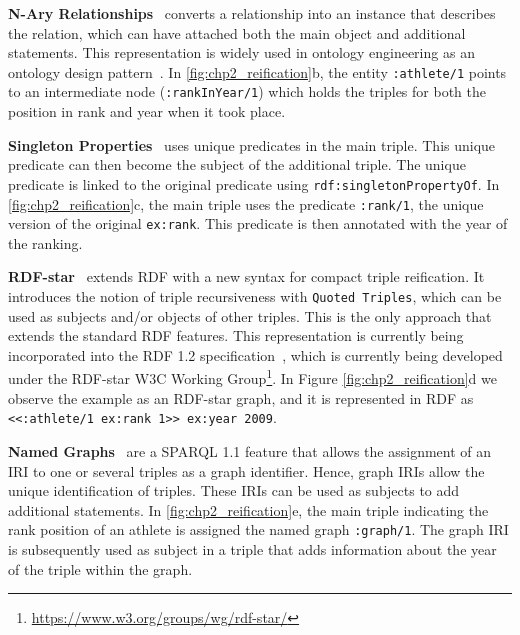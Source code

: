 \noindent\textbf{N-Ary Relationships}~\parencite{naryw3c2006} converts a relationship into an instance that describes the relation, which can have attached both the main object and additional statements.
This representation is widely used in ontology engineering as an ontology design pattern~\parencite{gangemi2013multi}. In \cref{fig:chp2_reification}b, the entity \texttt{:athlete/1} points to an intermediate node (\texttt{:rankInYear/1}) which holds the triples for both the position in rank and year when it took place.

\noindent\textbf{Singleton Properties}~\parencite{nguyen2014don} uses unique predicates in the main triple. This unique predicate can then become the subject of the additional triple. The unique predicate is linked to the original predicate using \texttt{rdf:singletonPropertyOf}.
In \cref{fig:chp2_reification}c, the main triple uses the predicate \texttt{:rank/1}, the unique version of the original \texttt{ex:rank}. This predicate is then annotated with the year of the ranking. 

\noindent\textbf{RDF-star}~\parencite{hartig2017foundations,hartig2023rdf} extends RDF with a new syntax for compact triple reification. 
It introduces the notion of triple recursiveness with \texttt{Quoted Triples}, which can be used as subjects and/or objects of other triples. This is the only approach that extends the standard RDF features. 
This representation is currently being incorporated into the RDF 1.2 specification~\parencite{hartig2023rdf}, which is currently being developed under the RDF-star W3C Working Group\footnote{\url{https://www.w3.org/groups/wg/rdf-star/}}.
In Figure \ref{fig:chp2_reification}d we observe the example as an RDF-star graph, and it is represented in RDF as \texttt{{<<:athlete/1 ex:rank 1>> ex:year 2009}}.


\noindent\textbf{Named Graphs}~\parencite{rdf} are a SPARQL 1.1 feature that allows the assignment of an IRI to one or several triples as a graph identifier. Hence, graph IRIs allow the unique identification of triples. These IRIs can be used as subjects to add additional statements. 
In \cref{fig:chp2_reification}e, the main triple indicating the rank position of an athlete is assigned the named graph \texttt{:graph/1}. The graph IRI is subsequently used as subject in a triple that adds information about the year of the triple within the graph. 
